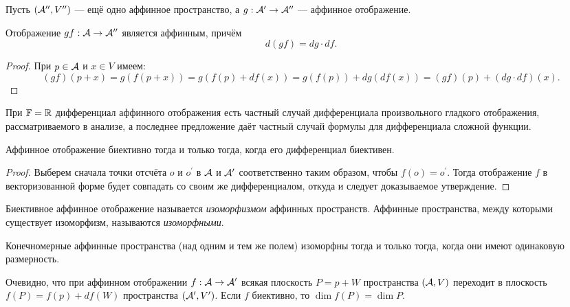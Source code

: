 Пусть $(\mathcal{A}^{\prime\prime}, V^{\prime\prime})$ --- ещё одно аффинное пространство, а $g: \mathcal{A}^\prime \to \mathcal{A}^{\prime\prime}$ --- аффинное отображение.

\begin{proposal}
    Отображение $gf: \mathcal{A} \to \mathcal{A}^{\prime\prime}$ является аффинным, причём
    \[
        d(gf) = dg \cdot df.
    \]
\end{proposal}

\begin{proof}
    При $p \in \mathcal{A}$ и $x \in V$ имеем:
    \[
        (gf)(p + x) = g(f(p + x)) = g(f(p) + df(x)) = g(f(p)) + dg(df(x)) = (gf)(p) + (dg \cdot df)(x).
    \]
\end{proof}

\begin{remark}
    При $\mathbb{F} = \mathbb{R}$ дифференциал аффинного отображения есть частный случай дифференциала произвольного гладкого отображения, рассматриваемого в анализе, а последнее предложение даёт частный случай формулы для дифференциала сложной функции.
\end{remark}

\begin{proposal}
    Аффинное отображение биективно тогда и только тогда, когда его дифференциал биективен.
\end{proposal}

\begin{proof}
    Выберем сначала точки отсчёта $o$ и $o^\prime$ в $\mathcal{A}$ и $\mathcal{A}^\prime$ соответственно таким образом, чтобы $f(o) = o^\prime$. Тогда отображение $f$ в векторизованной форме будет совпадать со своим же дифференциалом, откуда и следует доказываемое утверждение.
\end{proof}

\begin{definition}
    Биективное аффинное отображение называется \textit{изоморфизмом} аффинных пространств. Аффинные пространства, между которыми существует изоморфизм, называются \textit{изоморфными}.
\end{definition}

\begin{corollary}
    Конечномерные аффинные пространства (над одним и тем же полем) изоморфны тогда и только тогда, когда они имеют одинаковую размерность.
\end{corollary}

Очевидно, что при аффинном отображении $f: \mathcal{A} \to \mathcal{A}^\prime$ всякая плоскость $P = p + W$ пространства $(\mathcal{A}, V)$ переходит в плоскость $f(P) = f(p) + df(W)$ пространства $(\mathcal{A}^\prime, V^\prime)$. Если $f$ биективно, то $\dim f(P) = \dim P$.

